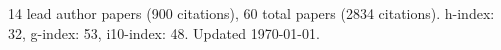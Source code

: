 14 lead author papers (900 citations),
60 total papers (2834 citations).\newline
h-index: 32, g-index: 53, i10-index: 48. Updated \today.